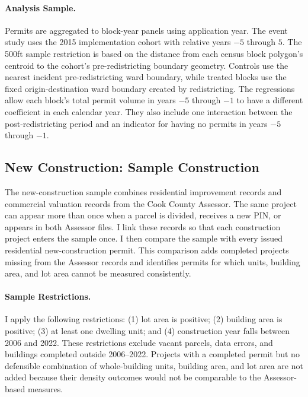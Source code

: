 \paragraph{Analysis Sample.}
Permits are aggregated to block-year panels using application year.
The event study uses the 2015 implementation cohort with relative years $-5$ through $5$.
The 500ft sample restriction is based on the distance from each census block polygon's centroid to the cohort's pre-redistricting boundary geometry.
Controls use the nearest incident pre-redistricting ward boundary, while treated blocks use the fixed origin-destination ward boundary created by redistricting.
The regressions allow each block's total permit volume in years $-5$ through $-1$ to have a different coefficient in each calendar year.
They also include one interaction between the post-redistricting period and an indicator for having no permits in years $-5$ through $-1$.

\subsection{New Construction: Sample Construction}
\label{subsec:new_construction_sample}

The new-construction sample combines residential improvement records and commercial valuation records from the Cook County Assessor.
The same project can appear more than once when a parcel is divided, receives a new PIN, or appears in both Assessor files.
I link these records so that each construction project enters the sample once.
I then compare the sample with every issued residential new-construction permit.
This comparison adds completed projects missing from the Assessor records and identifies permits for which units, building area, and lot area cannot be measured consistently.

\paragraph{Sample Restrictions.}
I apply the following restrictions: (1) lot area is positive; (2) building area is positive; (3) at least one dwelling unit; and (4) construction year falls between 2006 and 2022.
These restrictions exclude vacant parcels, data errors, and buildings completed outside 2006--2022.
Projects with a completed permit but no defensible combination of whole-building units, building area, and lot area are not added because their density outcomes would not be comparable to the Assessor-based measures.

